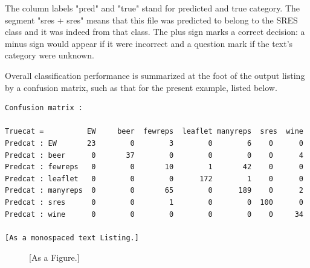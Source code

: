 \documentclass[output=paper]{langscibook}
\begin{document}
The column labels "pred" and "true" stand for predicted and true category. The segment "sres + sres" means that this file was predicted to belong to the SRES class and it was indeed from that class. The plus sign marks a correct decision: a minus sign would appear if it were incorrect and a question mark if the text's category were unknown.

Overall classification performance is summarized at the foot of the output listing by a confusion matrix, such as that for the present example, listed below.

\begin{lstlisting}[basicstyle=\small\ttfamily]
Confusion matrix :

Truecat =          EW     beer  fewreps  leaflet manyreps  sres  wine
Predcat : EW       23        0        3        0        6    0      0
Predcat : beer      0       37        0        0        0    0      4
Predcat : fewreps   0        0       10        1       42    0      0
Predcat : leaflet   0        0        0      172        1    0      0
Predcat : manyreps  0        0       65        0      189    0      2
Predcat : sres      0        0        1        0        0  100      0
Predcat : wine      0        0        0        0        0    0     34

[As a monospaced text Listing.]
\end{lstlisting}

  
\begin{figure}[H]
 

[As a Figure.]
\end{figure}

\begin{table}
\caption{[As a Table.]}
\end{table}
\end{document}
